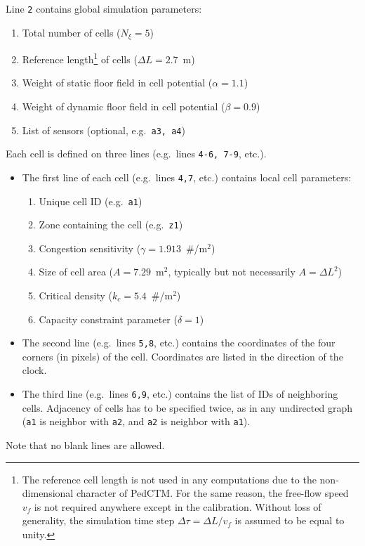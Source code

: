 \documentclass[a4paper,12pt]{article}
\begin{document}
Line \verb+2+ contains global simulation parameters:
\begin{enumerate}
\item Total number of cells ($N_\xi = 5$)
\item Reference length\footnote{The reference cell length is not used in any computations due to the non-dimensional character of PedCTM. For the same reason, the free-flow speed $v_f$ is not required anywhere except in the calibration. Without loss of generality, the simulation time step $\Delta \tau = \Delta L/v_f$ is assumed to be equal to unity.} of cells ($\Delta L = 2.7$~m)
\item Weight of static floor field in cell potential ($\alpha = 1.1$)
\item Weight of dynamic floor field in cell potential ($\beta = 0.9$)
\item List of sensors (optional, e.g.\ \verb+a3, a4+)
\end{enumerate}


Each cell is defined on three lines (e.g.\ lines \verb+4-6, 7-9+, etc.).
\begin{itemize}
	\item The first line of each cell (e.g.\ lines \verb+4,7+, etc.) contains local cell parameters:
\begin{enumerate}
\item Unique cell ID (e.g.\ \verb+a1+)
\item Zone containing the cell (e.g.\ \verb+z1+)
\item Congestion sensitivity ($\gamma = 1.913$~\#/m$^2$)
\item Size of cell area ($A = 7.29$~m$^2$, typically but not necessarily $A = \Delta L^2$)
\item Critical density ($k_c = 5.4$~\#/m$^2$)
\item Capacity constraint parameter ($\delta = 1$)
\end{enumerate}
\item The second line (e.g.\ lines \verb+5,8+, etc.) contains the coordinates of the four corners (in pixels) of the cell. Coordinates are listed in the direction of the clock.
\item The third line (e.g.\ lines \verb+6,9+, etc.) contains the list of IDs of neighboring cells. Adjacency of cells has to be specified twice, as in any undirected graph (\verb+a1+ is neighbor with \verb+a2+, and \verb+a2+ is neighbor with \verb+a1+).
\end{itemize}
Note that no blank lines are allowed.
\end{document}
